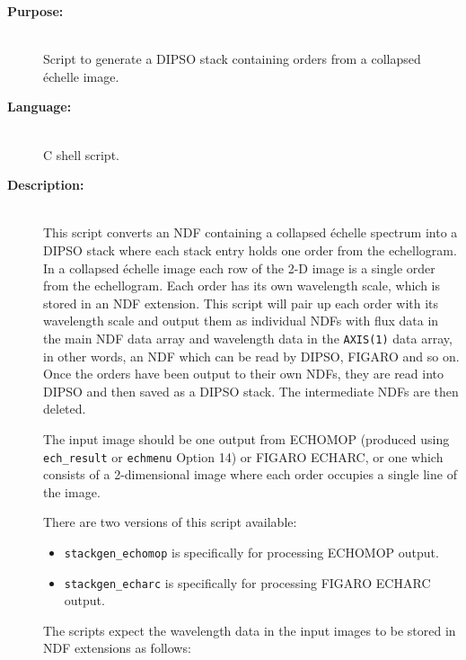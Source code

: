 \documentclass[twoside,11pt]{article}
\newcommand{\xref}[3]{#1}
\begin{document}
\begin{description}
\item [{\bf Purpose:}] \mbox{} \\
     Script to generate a \xref{DIPSO}{sun50}{} stack containing orders
     from a collapsed \'{e}chelle image.

\item [{\bf Language:}] \mbox{} \\
     C shell script.

\item [{\bf Description:}] \mbox{} \\
     This script converts an \xref{NDF}{sun33}{}
     containing a collapsed \'{e}chelle spectrum into a DIPSO stack where each
     stack entry holds one order from the echellogram.  In a collapsed
     \'{e}chelle image each row of the 2-D image is a single order from the
     echellogram.   Each order has its own wavelength scale, which is
     stored in an NDF extension.  This script will pair up each order
     with its wavelength scale and output them as individual NDFs with
     flux data in the main NDF data array and wavelength data in the
     \verb+AXIS(1)+ data array, in other words, an NDF which can be read by
     DIPSO, FIGARO and so on.  Once the orders have been output to their
     own NDFs, they are read into DIPSO and then saved as a DIPSO stack.
     The intermediate NDFs are then deleted.

     The input image should be one output from \xref{ECHOMOP}{sun152}{}
     (produced using \xref{{\tt ech\_result}}{sun152}{ech_result} or
     \xref{{\tt echmenu} Option 14}{sun152}{option14}) or FIGARO
     \xref{ECHARC}{sun86}{ECHARC}, or one which consists of a
     2-dimensional image where each order occupies a single line of the
     image.

     There are two versions of this script available:

\begin{itemize}

\item \verb+stackgen_echomop+ is specifically for processing ECHOMOP
      output.

\item \verb+stackgen_echarc+ is specifically for processing FIGARO ECHARC
      output.

\end{itemize}

     The scripts expect the wavelength data in the input images to be stored
     in NDF extensions as follows:


\end{description}
\end{document}
